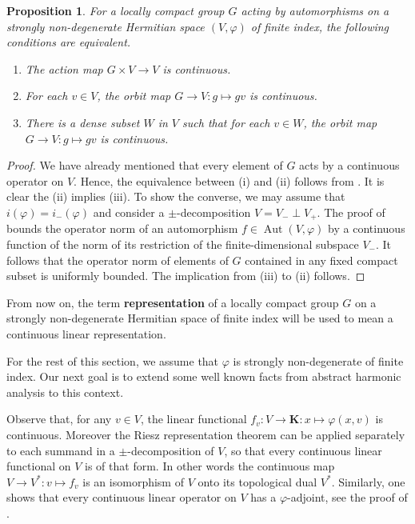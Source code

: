 \documentclass[12pt,a4paper]{amsproc}
\newtheorem{proposition}[theorem]{Proposition}
\theoremstyle{definition}
\DeclareMathOperator{\Aut}{Aut}
\newcommand{\KK}{\mathbf K}
\begin{document}
\begin{proposition}\label{prop:continuity}
For a locally compact group $G$ acting by automorphisms on a strongly non-degenerate Hermitian space $(V, \varphi)$ of finite index, the following conditions are equivalent.
\begin{enumerate}[label=(\roman*)]
\item The action map $G \times V \to V$ is continuous. 
\item For each $v \in V$, the orbit map $G \to V \colon g \mapsto gv$ is continuous. 
\item There is a dense subset $W$ in $V$ such that for each $v \in W$, the orbit map $G \to V \colon g \mapsto gv$ is continuous. 
\end{enumerate}
	 
\end{proposition}
\begin{proof}
We have already mentioned that every element of $G$ acts by a continuous operator on $V$. Hence, the equivalence between (i) and (ii) follows from \cite[Proposition 13.2]{Robert_book}. It is clear the (ii) implies (iii). To show the converse, we may assume that $i(\varphi) = i_-(\varphi)$ and consider a $\pm$-decomposition  $V = V_- \perp V_+$. The proof of  \cite[Proposition~ 9.7]{DuchesnePhD} bounds the operator norm of an automorphism $f \in \Aut(V, \varphi)$ by a continuous function of the norm of its restriction of the finite-dimensional subspace $V_-$. It follows that the operator norm of elements of $G$ contained in any fixed compact subset is uniformly bounded. The implication from (iii) to (ii) follows. 
\end{proof}

From now on, the term \textbf{representation} of  a locally compact group $G$ on a strongly non-degenerate Hermitian space of finite index will be used to mean a continuous linear representation. 
	
\medskip
For the rest of this section, we assume that $\varphi$ is 	strongly non-degenerate of finite index. Our next goal is to extend some well known facts from abstract harmonic analysis to this context.  

Observe that, for any $v \in V$, the linear functional $f_v \colon V \to \KK: x \mapsto \varphi(x, v)$ is continuous. Moreover the Riesz representation theorem can be applied separately to each summand in a $\pm$-decomposition of $V$, so that every continuous linear functional on $V$ is of that form. In other words the continuous map $V \to V^* : v \mapsto f_v$ is an isomorphism of $V$ onto its topological dual $V^*$. Similarly, one shows that  every continuous linear operator on $V$ has a $\varphi$-adjoint, see the proof of \cite[Proposition~5.4]{MoPy}.  
\end{document}
